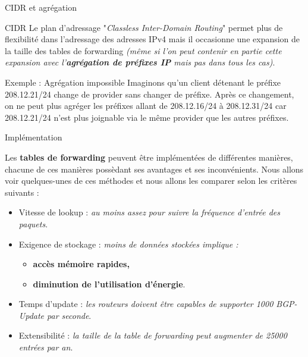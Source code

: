 \documentclass{beamer}
\newcommand{\term}[1]{\textit{\textcolor{maintitle}{#1}}}
\newcommand{\cerm}[1]{\textcolor{maintitle}{#1}}
\begin{document}
\begin{frame}{CIDR et agrégation}

\begin{block}{CIDR}
Le plan d'adressage "\textit{\term{C}lassless \term{I}nter-\term{D}omain \term{R}outing}" permet plus de flexibilité dans 
l'adressage des adresses IPv4 mais il occasionne une expansion de la taille des tables de forwarding \textit{(même si l'on peut 
contenir en partie cette expansion avec l'\textbf{agrégation de préfixes IP} mais pas dans tous les cas)}.
\end{block}

\begin{exampleblock}{Exemple : Agrégation impossible}
Imaginons qu'un client détenant le préfixe 208.12.21/24 change de provider sans changer de préfixe. Après ce changement, on ne 
peut plus agréger les préfixes allant de 208.12.16/24 à 208.12.31/24 car 208.12.21/24 n'est plus joignable via le même provider
que les autres préfixes.
\end{exampleblock}

\end{frame}

\begin{frame}{Implémentation}

Les \textbf{tables de forwarding} peuvent être implémentées de différentes manières, chacune de ces manières possèdant ses 
avantages et ses inconvénients. Nous allons voir quelques-unes de ces méthodes et nous allons les comparer selon les critères 
suivants : \\
\begin{itemize}
\pause \item \cerm{Vitesse de lookup} : \textit{au moins assez pour suivre la fréquence d'entrée des paquets}.
\pause \item \cerm{Exigence de stockage} : \textit{moins de données stockées implique :}
	\begin{itemize}
	\item \textbf{accès mémoire rapides,}
	\item \textbf{diminution de l'utilisation d'énergie}.
	\end{itemize}
\pause \item \cerm{Temps d'update} : \textit{les routeurs doivent être capables de supporter 1000 BGP-Update par seconde}.
\pause \item \cerm{Extensibilité} : \textit{la taille de la table de forwarding peut augmenter de 25000 entrées par an}.
\end{itemize}

\end{frame}
\end{document}
